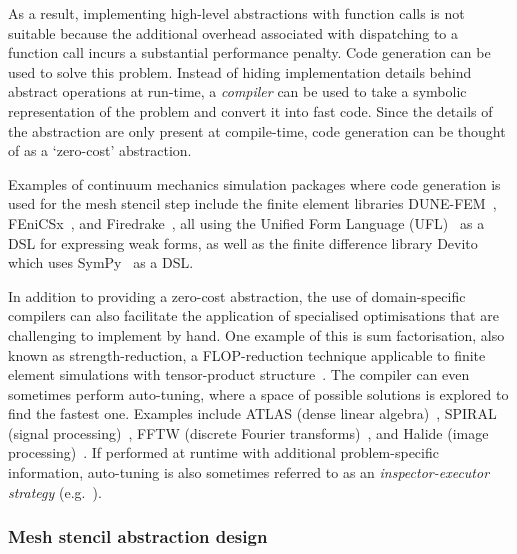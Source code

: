 \documentclass[thesis]{subfiles}
\begin{document}
As a result, implementing high-level abstractions with function calls is not suitable because the additional overhead associated with dispatching to a function call incurs a substantial performance penalty.
Code generation can be used to solve this problem.
Instead of hiding implementation details behind abstract operations at run-time, a \emph{compiler} can be used to take a symbolic representation of the problem and convert it into fast code.
Since the details of the abstraction are only present at compile-time, code generation can be thought of as a `zero-cost' abstraction.

Examples of continuum mechanics simulation packages where code generation is used for the mesh stencil step include the finite element libraries DUNE-FEM~\cite{dednerGenericInterfaceParallel2010}, FEniCSx~\cite{barattaDOLFINxNextGeneration2023}, and Firedrake~\cite{FiredrakeUserManual}, all using the Unified Form Language (UFL)~\cite{alnaesUnifiedFormLanguage2014a} as a DSL for expressing weak forms, as well as the finite difference library Devito~\cite{devito-api,10.1145/3374916} which uses SymPy~\cite{10.7717/peerj-cs.103} as a DSL.

In addition to providing a zero-cost abstraction, the use of domain-specific compilers can also facilitate the application of specialised optimisations that are challenging to implement by hand.
One example of this is sum factorisation, also known as strength-reduction, a FLOP-reduction technique applicable to finite element simulations with tensor-product structure~\cite{lamReordering1997,homolyaExposingExploitingStructure2017}.
The compiler can even sometimes perform auto-tuning, where a space of possible solutions is explored to find the fastest one.
Examples include ATLAS (dense linear algebra)~\cite{whaleyAutomatedEmpiricalOptimizations2001}, SPIRAL (signal processing)~\cite{puschelSPIRALCodeGeneration2005}, FFTW (discrete Fourier transforms)~\cite{frigoDesignImplementationFFTW32005}, and Halide (image processing)~\cite{ragan-kelleyHalideLanguageCompiler2013}.
If performed at runtime with additional problem-specific information, auto-tuning is also sometimes referred to as an \emph{inspector-executor strategy} (e.g.~\cite{baxter1989run,kriegerLoopChainingProgramming2013,stroutSparsePolyhedralFramework2018}).

\subsubsection{Mesh stencil abstraction design}
\end{document}
